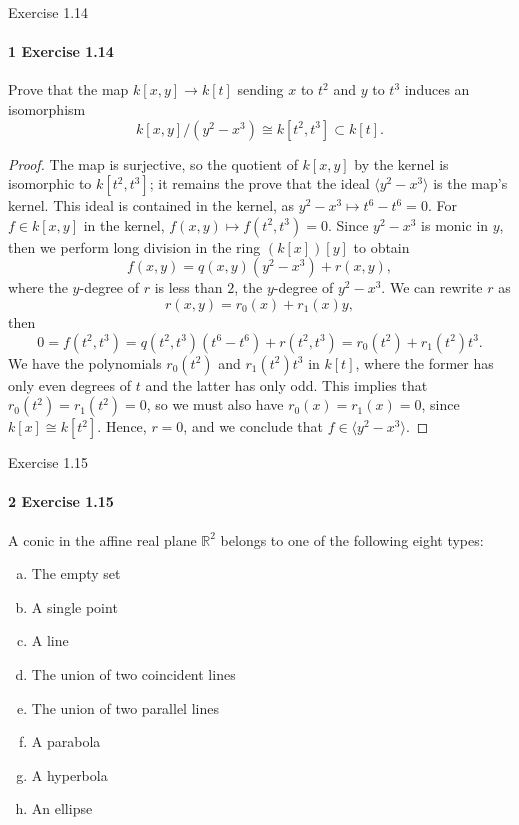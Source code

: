 \documentclass[12pt]{article}
\newlength{\myparskip}
\newenvironment{fullbox}{\begin{lrbox}{\savefullbox}\begin{minipage}{\dimexpr\textwidth-2\fboxsep\relax}\setlength{\parskip}{\myparskip}}{\end{minipage}\end{lrbox}\framebox[\textwidth]{\usebox{\savefullbox}}}
\newenvironment{pbox}[1][]{\begin{fullbox}\ifx#1\empty\else\paragraph{#1}\fi}{\end{fullbox}}
\newcommand{\R}{\mathbb{R}}
\newcommand{\<}{\langle}
\renewcommand{\>}{\rangle}
\newcommand{\isom}{\cong}
\begin{document}
\thispagestyle{title}

\begin{pbox}[1 Exercise 1.14]
    Prove that the map $k[x, y] \to k[t]$ sending $x$ to $t^2$ and $y$ to $t^3$ induces an isomorphism
    \[
        k[x, y]/(y^2 - x^3) \isom k[t^2, t^3] \subset k[t].
    \]
\end{pbox}

\begin{proof}
    The map is surjective, so the quotient of $k[x, y]$ by the kernel is isomorphic to $k[t^2, t^3]$; it remains the prove that the ideal $\<y^2 - x^3\>$ is the map's kernel. This ideal is contained in the kernel, as $y^2 - x^3 \mapsto t^6 - t^6 = 0$. For $f \in k[x, y]$ in the kernel, $f(x, y) \mapsto f(t^2, t^3) = 0$. Since $y^2 - x^3$ is monic in $y$, then we perform long division in the ring $(k[x])[y]$ to obtain
    \[
        f(x, y) = q(x, y)(y^2 - x^3) + r(x, y),
    \]
    where the $y$-degree of $r$ is less than $2$, the $y$-degree of $y^2 - x^3$. We can rewrite $r$ as 
    \[
        r(x, y) = r_0(x) + r_1(x)y,
    \]
    then
    \[
        0 = f(t^2, t^3) = q(t^2, t^3)(t^6 - t^6) + r(t^2, t^3) = r_0(t^2) + r_1(t^2)t^3.
    \]
    We have the polynomials $r_0(t^2)$ and $r_1(t^2)t^3$ in $k[t]$, where the former has only even degrees of $t$ and the latter has only odd. This implies that $r_0(t^2) = r_1(t^2) = 0$, so we must also have $r_0(x) = r_1(x) = 0$, since $k[x] \isom k[t^2]$. Hence, $r = 0$, and we conclude that $f \in \<y^2 - x^3\>$.

\end{proof}

\newpage
\begin{pbox}[2 Exercise 1.15]
    A conic in the affine real plane $\R^2$ belongs to one of the following eight types:
    \begin{enumerate}[a.]
        \item The empty set
        \item A single point
        \item A line
        \item The union of two coincident lines
        \item The union of two parallel lines
        \item A parabola
        \item A hyperbola
        \item An ellipse
    \end{enumerate}
\end{pbox}
\end{document}
